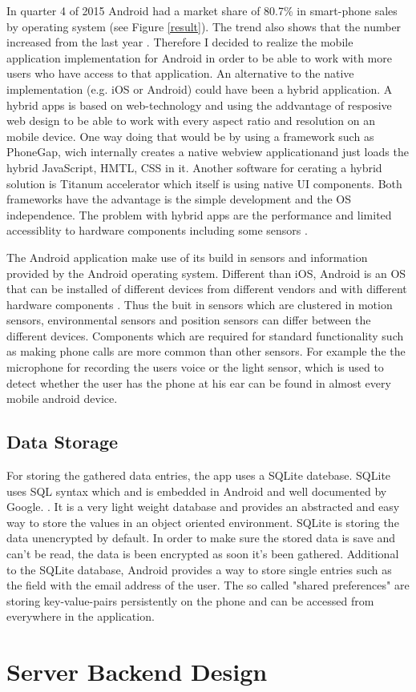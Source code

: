 \begin{flushleft}
In quarter 4 of 2015 Android had a market share of 80.7\% in smart-phone sales by operating system (see Figure \ref{result}). The trend also shows that the number increased from the last year \cite{gartnerMobileOSMarketshare}. Therefore I decided to realize the mobile application implementation for Android in order to be able to work with more users who have access to that application.
An alternative to the native implementation (e.g. iOS or Android) could have been a hybrid application. A hybrid apps is based on web-technology and using the addvantage of resposive web design to be able to work with every aspect ratio and resolution on an mobile device. One way doing that would be by using a framework such as PhoneGap, wich internally creates a native webview applicationand just loads the hybrid JavaScript, HMTL, CSS in it. Another software for cerating a hybrid solution is Titanum accelerator which itself is using native UI components. Both frameworks have the advantage is the simple development and the OS independence. The problem with hybrid apps are the performance and limited accessiblity to hardware components including some sensors \cite{holzinger2012making}.  

The Android application make use of its build in sensors and information provided by the Android operating system. Different than iOS, Android is an OS that can be installed of different devices from different vendors and with different hardware components \cite{goadrich2011smart}. Thus the buit in sensors which are clustered in motion sensors, environmental sensors and position sensors \cite{androidDevelopers} can differ between the different devices. Components which are required for standard functionality such as making phone calls are more common than other sensors. For example the the microphone for recording the users voice or the light sensor, which is used to detect whether the user has the phone at his ear can be found in almost every mobile android device. 

\subsection{Data Storage}
For storing the gathered data entries, the app uses a SQLite datebase. SQLite uses SQL syntax which and is embedded in Android and well documented by Google. \cite{vogel2010android}. It is a very light weight database and provides an abstracted and easy way to store the values in an object oriented environment. SQLite is storing the data unencrypted by default. In order to make sure the stored data is save and can't be read, the data is been encrypted as soon it's been gathered.
Additional to the SQLite database, Android provides a way to store single entries such as the field with the email address of the user. The so called "shared preferences" are storing key-value-pairs persistently on the phone and can be accessed from everywhere in the application.


\end{flushleft}

\section{Server Backend Design}





